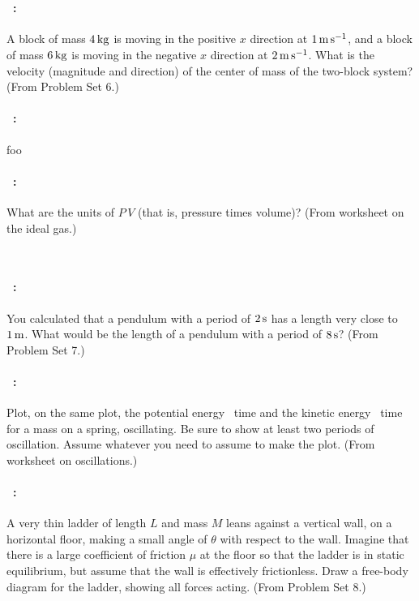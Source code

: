 \documentclass[12pt]{article} 
\begin{document}
\vfill
~
\clearpage

\paragraph{\problemname~\theproblem:}%
A block of mass $4\,\mathrm{kg}$ is moving in the positive $x$ direction at
$1\,\mathrm{m}\,\mathrm{s}^{-1}$, and a block of mass $6\,\mathrm{kg}$ is moving in the negative $x$ direction
at $2\,\mathrm{m}\,\mathrm{s}^{-1}$. What is the velocity (magnitude and direction) of the
center of mass of the two-block system?
(From Problem Set 6.)

\vfill

\paragraph{\problemname~\theproblem:}%
foo

\vfill

\paragraph{\problemname~\theproblem:}%
What are the units of $P\,V$ (that is, pressure times volume)?
(From worksheet on the ideal gas.)

\vfill
~
\clearpage

\paragraph{\problemname~\theproblem:}%
You calculated that a pendulum with a period of $2\,\mathrm{s}$ has a length
very close to $1\,\mathrm{m}$. What would be the length of a pendulum with
a period of $8\,\mathrm{s}$? (From Problem Set 7.)

\vfill

\paragraph{\problemname~\theproblem:}%
Plot, on the same plot, the potential energy \vs\ time and the kinetic
energy \vs\ time for a mass on a spring, oscillating. Be sure to show at
least two periods of oscillation. Assume whatever you need to assume to
make the plot.
(From worksheet on oscillations.)

\vfill

\paragraph{\problemname~\theproblem:}%
A very thin ladder of length $L$ and mass $M$ leans against a vertical
wall, on a horizontal floor, making a small angle of $\theta$ with respect
to the wall.  Imagine that there is a large coefficient of friction
$\mu$ at the floor so that the ladder is in static
equilibrium, but assume that the wall is effectively frictionless.
Draw a free-body diagram for the ladder, showing all
forces acting.
(From Problem Set 8.)
\end{document}
